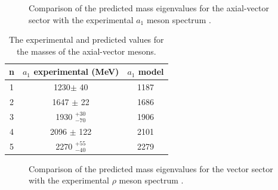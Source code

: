 \documentclass[12pt]{article}
\begin{document}
\begin{figure}[htb]
\caption{Comparison of the predicted mass eigenvalues for the axial-vector sector with the experimental $a_1$ meson spectrum \cite{PDG}.}
\end{figure}

\begin{table}[htb]
\center
\begin{tabular}{| c || c | c  |}
\hline
n & $a_1$ experimental (MeV) & $a_1$ model \\
\hline
1 & 1230$\pm$ 40 &	    	1187	 \\
2 & 1647 $\pm$ 22 & 	1686	 \\
3 & 1930  $^{+30}_{-70}$ & 1906\\
4 & 2096 $\pm$ 122 &      2101	 \\ 
5 & 2270 $^{+55}_{-40}$  & 2279\\
\hline
\end{tabular}
\caption{The experimental and predicted values for the masses of the axial-vector mesons.}
\label{tabAxial}
\end{table}

\begin{figure}[htb]
\caption{Comparison of the predicted mass eigenvalues for the vector sector with the experimental $\rho$ meson spectrum \cite{PDG}.}
\label{figRho}
\end{figure}
\end{document}
